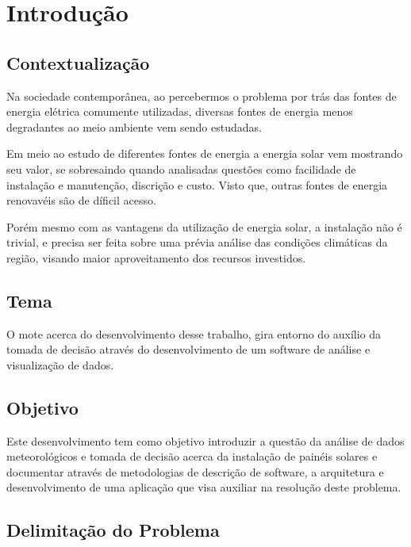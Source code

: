 \chapter{Introdução}

\section{Contextualização}

Na sociedade contemporânea, ao percebermos o problema por trás das fontes de energia elétrica comumente utilizadas, diversas fontes de energia menos degradantes ao meio ambiente vem sendo estudadas.

Em meio ao estudo de diferentes fontes de energia a energia solar vem mostrando seu valor, se sobresaindo quando analisadas questões como facilidade de instalação e manutenção, discrição e custo. Visto que, outras fontes de energia renovavéis são de díficil acesso.

Porém mesmo com as vantagens da utilização de energia solar, a instalação não é trivial, e precisa ser feita sobre uma prévia análise das condições climáticas da região, visando maior aproveitamento dos recursos investidos.

\section{Tema}

O mote acerca do desenvolvimento desse trabalho, gira entorno do auxílio da tomada de decisão através do desenvolvimento de um software de análise e visualização de dados.

\section{Objetivo}

Este desenvolvimento tem como objetivo introduzir a questão da análise de dados meteorológicos e tomada de decisão acerca da instalação de painéis solares e documentar através de metodologias de descrição de software, a arquitetura e desenvolvimento de uma aplicação que visa auxiliar na resolução deste problema.

\section{Delimitação do Problema}

